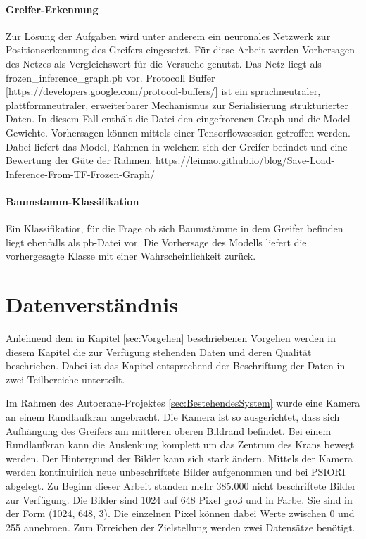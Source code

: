 	\paragraph{Greifer-Erkennung} 
Zur Lösung der Aufgaben wird unter anderem ein neuronales Netzwerk zur Positionserkennung des Greifers eingesetzt. Für diese Arbeit werden Vorhersagen des Netzes als Vergleichswert für die Versuche genutzt. Das Netz liegt als frozen\_inference\_graph.pb vor. Protocoll Buffer  [https://developers.google.com/protocol-buffers/] ist ein sprachneutraler, plattformneutraler, erweiterbarer Mechanismus zur Serialisierung strukturierter Daten. In diesem Fall enthält die Datei den eingefrorenen Graph und die Model Gewichte. Vorhersagen können mittels einer Tensorflowsession getroffen werden. Dabei liefert das Model, Rahmen in welchem sich der Greifer befindet und eine Bewertung der Güte der Rahmen.
		https://leimao.github.io/blog/Save-Load-Inference-From-TF-Frozen-Graph/
		
	\paragraph{Baumstamm-Klassifikation} 
	Ein Klassifikatior, für die Frage ob sich Baumstämme in dem Greifer befinden liegt ebenfalls als pb-Datei vor. Die Vorhersage des Modells liefert die vorhergesagte Klasse mit einer Wahrscheinlichkeit zurück.

	\section{Datenverständnis}
	\label{sec:DataUnderstanding}
	Anlehnend dem in Kapitel \ref{sec:Vorgehen} beschriebenen Vorgehen  werden in diesem Kapitel die zur Verfügung stehenden Daten und deren Qualität beschrieben. Dabei ist das Kapitel entsprechend der Beschriftung der Daten in zwei Teilbereiche unterteilt.
	
	Im Rahmen des Autocrane-Projektes \ref{sec:BestehendesSystem}  wurde eine Kamera an einem Rundlaufkran angebracht. Die Kamera ist so ausgerichtet, dass sich Aufhängung des Greifers am mittleren oberen Bildrand befindet. Bei einem Rundlaufkran kann die Auslenkung komplett um das Zentrum des Krans bewegt werden. Der Hintergrund der Bilder kann sich stark ändern. Mittels der Kamera werden kontinuirlich neue unbeschriftete Bilder aufgenommen und bei PSIORI abgelegt. Zu Beginn dieser Arbeit standen mehr 385.000 nicht beschriftete Bilder zur Verfügung. Die Bilder sind 1024 auf 648 Pixel groß und in Farbe. Sie sind in der Form (1024, 648, 3). Die einzelnen Pixel können dabei Werte zwischen 0 und 255 annehmen. 
	Zum Erreichen der Zielstellung werden zwei Datensätze benötigt.
	
